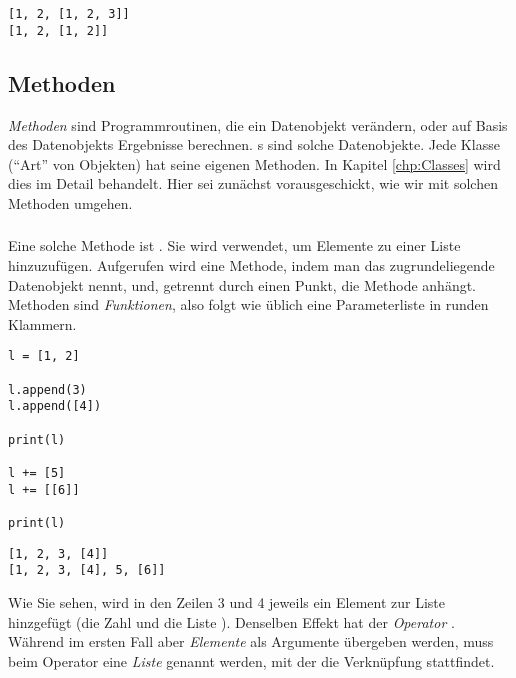 \begin{cmdbox}[Ausgabe]
\begin{verbatim}
[1, 2, [1, 2, 3]]
[1, 2, [1, 2]]
\end{verbatim}
\end{cmdbox}


\subsection{Methoden}
\emph{Methoden} sind Programmroutinen, die ein Datenobjekt verändern, oder auf Basis des Datenobjekts Ergebnisse berechnen. s sind solche Datenobjekte. Jede Klasse (\ie \enquote{Art} von Objekten) hat seine eigenen Methoden. In Kapitel \ref{chp:Classes} wird dies im Detail behandelt. Hier sei zunächst vorausgeschickt, wie wir mit solchen Methoden umgehen.

\subsubsection{}
Eine solche Methode ist . Sie wird verwendet, um Elemente zu einer Liste hinzuzufügen. Aufgerufen wird eine Methode, indem man das zugrundeliegende Datenobjekt nennt, und, getrennt durch einen Punkt, die Methode anhängt. Methoden sind \emph{Funktionen}, also folgt wie üblich eine Parameterliste in runden Klammern.

\begin{codebox}
\begin{verbatim}
l = [1, 2]

l.append(3)
l.append([4])

print(l)

l += [5]
l += [[6]]

print(l)
\end{verbatim}
\end{codebox}

\begin{cmdbox}[Ausgabe]
\begin{verbatim}
[1, 2, 3, [4]]
[1, 2, 3, [4], 5, [6]]
\end{verbatim}
\end{cmdbox}

Wie Sie sehen, wird in den Zeilen 3 und 4 jeweils ein Element zur Liste hinzgefügt (die Zahl  und die Liste \inPy{[4]}). Denselben Effekt hat der \emph{Operator} \inPy{+=}. Während im ersten Fall aber \emph{Elemente} als Argumente übergeben werden, muss beim Operator eine \emph{Liste} genannt werden, mit der die Verknüpfung stattfindet.

